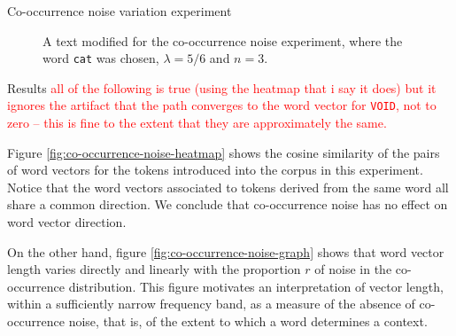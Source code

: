 \documentclass{article} %
\newcommand{\word}[1]{\texttt{#1}}
\begin{document}
\begin{section}{Co-occurrence noise variation experiment}
\begin{table}\label{cooccurrence-noise-words}
	
	\label{fig:co-occurrence-noise-counts}
	\caption{Occurrence counts for words chosen for the co-occurrence noise experiment. }
\end{table}

\begin{figure}
	\begin{mdframed}
	
	\end{mdframed}
	\caption{A text modified for the co-occurrence noise experiment, where the word \word{cat} was chosen, $\lambda = 5/6$ and $n=3$.}
\label{fig:co-occurrence-noise-experiment-text}
\end{figure}

\begin{subsection}{Results}
	\textcolor{red}{all of the following is true (using the heatmap that i say it does) but it ignores the artifact that the path converges to the word vector for \word{VOID}, not to zero -- this is fine to the extent that they are approximately the same.}

Figure \ref{fig:co-occurrence-noise-heatmap} shows the cosine similarity of the pairs of word vectors for the tokens introduced into the corpus in this experiment.
Notice that the word vectors associated to tokens derived from the same word all share a common direction.
We conclude that co-occurrence noise has no effect on word vector direction.

On the other hand, figure \ref{fig:co-occurrence-noise-graph} shows that word vector length varies directly and linearly with the proportion $r$ of noise in the co-occurrence distribution.
This figure motivates an interpretation of vector length, within a sufficiently narrow frequency band, as a measure of the absence of co-occurrence noise, that is, of the extent to which a word determines a context.



\end{subsection}
\end{section}
\end{document}
